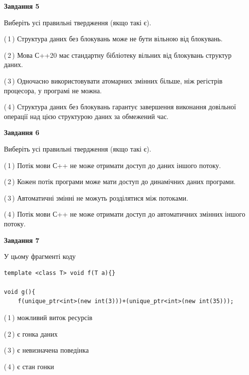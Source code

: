 \documentclass[12pt, ukrainian]{article}
\begin{document}
\begin {large}
{\begin{center}
\textbf{Завдання 5}
\end{center}

Виберіть усі правильні твердження (якщо такі є).\par
\vspace{2mm}

(\,1\,) Структура даних без блокувань може не бути вільною від блокувань.%

(\,2\,) Мова С++20 має стандартну бібліотеку вільних від блокувань структур даних.%

(\,3\,) Одночасно використовувати атомарних змінних більше, ніж регістрів процесора, у програмі не можна.%

(\,4\,) Структура даних без блокувань гарантує завершення виконання довільної операції над цією структурою даних за обмежений час.%
\newpage


\begin{center}
\textbf{Завдання 6}
\end{center}

Виберіть усі правильні твердження (якщо такі є).\par
\vspace{2mm}

(\,1\,) Потік мови С++ не може отримати доступ до даних іншого потоку.%

(\,2\,) Кожен потік програми може мати доступ до динамічних даних програми.%

(\,3\,) Автоматичні змінні не можуть розділятися між потоками.%

(\,4\,) Потік мови С++ не може отримати доступ до автоматичних змінних іншого потоку.%


\begin{center}
\textbf{Завдання 7}
\end{center}

У цьому фрагменті коду
\begin{verbatim}
template <class T> void f(T a){}

void g(){
    f(unique_ptr<int>(new int(3)))+(unique_ptr<int>(new int(35)));
\end{verbatim}

(\,1\,) можливий виток ресурсів%

(\,2\,) є гонка даних%

(\,3\,) є невизначена поведінка%

(\,4\,) є стан гонки%

}
\end {large}

\vspace{4mm}
\newpage
\end{document}
